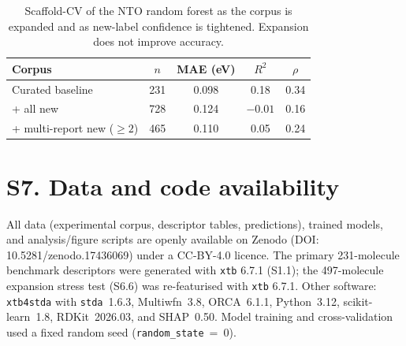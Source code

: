 \documentclass[twoside,twocolumn,9pt]{extarticle}
\begin{document}
\begin{table}[htbp]
  \centering
  \caption{Scaffold-CV of the NTO random forest as the corpus is expanded and as
    new-label confidence is tightened. Expansion does not improve accuracy.}
  \label{tab:expansion}
  \footnotesize
  \begin{tabular}{lcccc}
    \toprule
    Corpus & $n$ & MAE (eV) & $R^2$ & $\rho$ \\
    \midrule
    Curated baseline            & 231 & 0.098 & \phantom{$-$}0.18 & 0.34 \\
    + all new                   & 728 & 0.124 & $-0.01$           & 0.16 \\
    + multi-report new ($\ge 2$) & 465 & 0.110 & \phantom{$-$}0.05 & 0.24 \\
    \bottomrule
  \end{tabular}
\end{table}

\section*{S7. Data and code availability}
All data (experimental corpus, descriptor tables, predictions), trained models,
and analysis/figure scripts are openly available on Zenodo
(DOI: 10.5281/zenodo.17436069) under a CC-BY-4.0 licence. The primary
\num{231}-molecule benchmark descriptors were generated with \texttt{xtb} 6.7.1
(S1.1); the \num{497}-molecule expansion stress test (S6.6) was re-featurised with
\texttt{xtb} 6.7.1. Other software: \texttt{xtb4stda} with \texttt{stda}~1.6.3,
Multiwfn~3.8, ORCA~6.1.1, Python~3.12, scikit-learn~1.8, RDKit~2026.03, and
SHAP~0.50. Model training and cross-validation used a fixed random seed
(\texttt{random\_state}~=~0).

\end{document}
